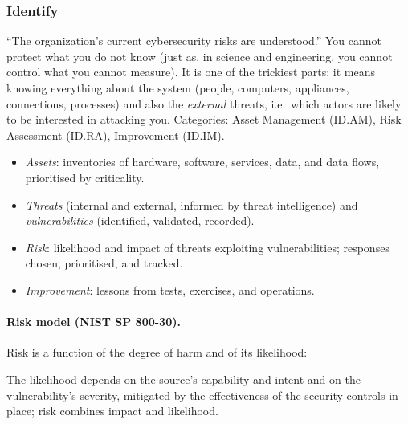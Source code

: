 \subsubsection{Identify}
\enquote{The organization's current cybersecurity risks are understood.} You cannot protect what you do not know (just as, in science and engineering, you cannot control what you cannot measure). It is one of the trickiest parts: it means knowing everything about the system (people, computers, appliances, connections, processes) and also the \emph{external} threats, i.e.\ which actors are likely to be interested in attacking you. Categories: Asset Management (ID.AM), Risk Assessment (ID.RA), Improvement (ID.IM).
\begin{itemize}
    \item \emph{Assets}: inventories of hardware, software, services, data, and data flows, prioritised by criticality.
    \item \emph{Threats} (internal and external, informed by threat intelligence) and \emph{vulnerabilities} (identified, validated, recorded).
    \item \emph{Risk}: likelihood and impact of threats exploiting vulnerabilities; responses chosen, prioritised, and tracked.
    \item \emph{Improvement}: lessons from tests, exercises, and operations.
\end{itemize}

\paragraph{Risk model (NIST SP 800-30).} Risk is a function of the degree of harm and of its likelihood:
\begin{center}
\end{center}
The likelihood depends on the source's capability and intent and on the vulnerability's severity, mitigated by the effectiveness of the security controls in place; risk combines impact and likelihood.

